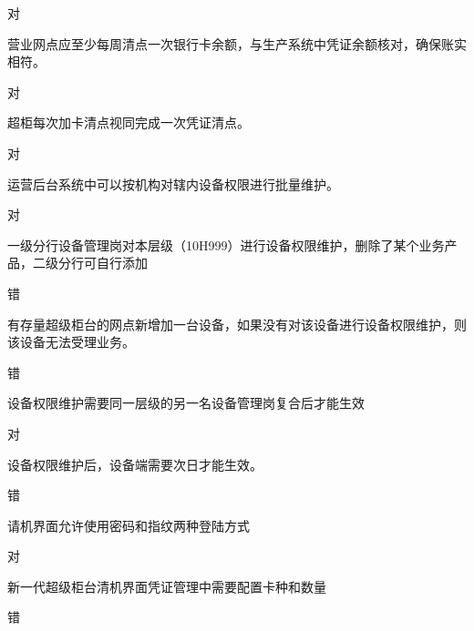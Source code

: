 \documentclass[kindlepaper]{BHCexam4kindle}
\begin{document}
\begin{questions}
\begin{solution} 对 \end{solution}
\qs 营业网点应至少每周清点一次银行卡余额，与生产系统中凭证余额核对，确保账实相符。 \xx
\begin{solution} 对 \end{solution}
\qs 超柜每次加卡清点视同完成一次凭证清点。 \xx
\begin{solution} 对 \end{solution}
\qs 运营后台系统中可以按机构对辖内设备权限进行批量维护。 \xx
\begin{solution} 对 \end{solution}
\qs 一级分行设备管理岗对本层级（10H999）进行设备权限维护，删除了某个业务产品，二级分行可自行添加 \xx
\begin{solution} 错 \end{solution}
\qs 有存量超级柜台的网点新增加一台设备，如果没有对该设备进行设备权限维护，则该设备无法受理业务。 \xx
\begin{solution} 错 \end{solution}
\qs 设备权限维护需要同一层级的另一名设备管理岗复合后才能生效 \xx
\begin{solution} 对 \end{solution}
\qs 设备权限维护后，设备端需要次日才能生效。 \xx
\begin{solution} 错 \end{solution}
\qs 请机界面允许使用密码和指纹两种登陆方式 \xx
\begin{solution} 对 \end{solution}
\qs 新一代超级柜台清机界面凭证管理中需要配置卡种和数量 \xx
\begin{solution} 错 \end{solution}

\end{questions}
\end{document}

